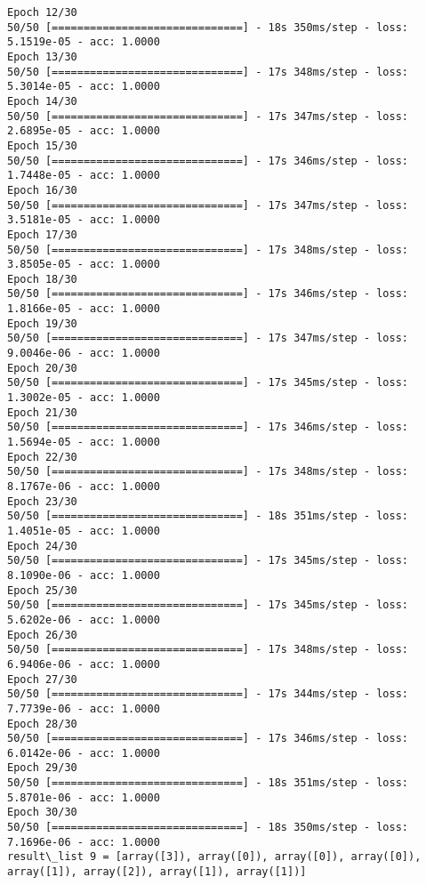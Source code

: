 \documentclass[11pt]{article}
\begin{document}
\begin{Verbatim}[commandchars=\\\{\}]
Epoch 12/30
50/50 [==============================] - 18s 350ms/step - loss: 5.1519e-05 - acc: 1.0000
Epoch 13/30
50/50 [==============================] - 17s 348ms/step - loss: 5.3014e-05 - acc: 1.0000
Epoch 14/30
50/50 [==============================] - 17s 347ms/step - loss: 2.6895e-05 - acc: 1.0000
Epoch 15/30
50/50 [==============================] - 17s 346ms/step - loss: 1.7448e-05 - acc: 1.0000
Epoch 16/30
50/50 [==============================] - 17s 347ms/step - loss: 3.5181e-05 - acc: 1.0000
Epoch 17/30
50/50 [==============================] - 17s 348ms/step - loss: 3.8505e-05 - acc: 1.0000
Epoch 18/30
50/50 [==============================] - 17s 346ms/step - loss: 1.8166e-05 - acc: 1.0000
Epoch 19/30
50/50 [==============================] - 17s 347ms/step - loss: 9.0046e-06 - acc: 1.0000
Epoch 20/30
50/50 [==============================] - 17s 345ms/step - loss: 1.3002e-05 - acc: 1.0000
Epoch 21/30
50/50 [==============================] - 17s 346ms/step - loss: 1.5694e-05 - acc: 1.0000
Epoch 22/30
50/50 [==============================] - 17s 348ms/step - loss: 8.1767e-06 - acc: 1.0000
Epoch 23/30
50/50 [==============================] - 18s 351ms/step - loss: 1.4051e-05 - acc: 1.0000
Epoch 24/30
50/50 [==============================] - 17s 345ms/step - loss: 8.1090e-06 - acc: 1.0000
Epoch 25/30
50/50 [==============================] - 17s 345ms/step - loss: 5.6202e-06 - acc: 1.0000
Epoch 26/30
50/50 [==============================] - 17s 348ms/step - loss: 6.9406e-06 - acc: 1.0000
Epoch 27/30
50/50 [==============================] - 17s 344ms/step - loss: 7.7739e-06 - acc: 1.0000
Epoch 28/30
50/50 [==============================] - 17s 346ms/step - loss: 6.0142e-06 - acc: 1.0000
Epoch 29/30
50/50 [==============================] - 18s 351ms/step - loss: 5.8701e-06 - acc: 1.0000
Epoch 30/30
50/50 [==============================] - 18s 350ms/step - loss: 7.1696e-06 - acc: 1.0000
result\_list 9 = [array([3]), array([0]), array([0]), array([0]), array([1]), array([2]), array([1]), array([1])]

    \end{Verbatim}
\end{document}
